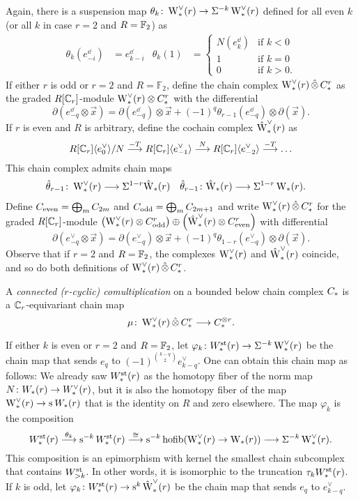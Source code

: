 Again, there is a suspension map $\theta_k\colon \rWd(r)\to \susp{-k}\rWd(r)$ defined for all even $k$ (or all $k$ in case $r=2$ and $R=\bF_2$) as
\begin{align*}
	\theta_k(e_{-i}^\dd) &= e_{k-i}^\dd 
	&
	\theta_k(1) &= \begin{cases} N(e_k^\dd) &\text{if $k<0$} \\ 1 &\text{if $k=0$} \\ 0 &\text{if $k>0$.} \end{cases}
\end{align*}
If either $r$ is odd or $r=2$ and $R=\mathbb{F}_2$, define the chain complex $\rWd(r)\hotimes \rucadenas$ as the graded $R[\Cyc_r]$-module $\rWd(r)\otimes \rucadenas$ with the differential
\[
\partial(e^\dd_{-q}\otimes \vec{x}) = \partial (e^\dd_{-q})\otimes \vec{x} + (-1)^q \theta_{r-1}(e^\dd_{-q})\otimes \partial (\vec{x}).
\]
If $r$ is even and $R$ is arbitrary, define the cochain complex $\rWhatd(r)$ as
\[
R[\Cyc_r]\langle e_{0}^\dd\rangle / N \overset{-T}{\lra} R[\Cyc_r]\langle e_{-1}^\dd\rangle \overset{N}{\lra} R[\Cyc_r]\langle e_{-2}^\dd\rangle \overset{-T}{\lra}\ldots
\]
This chain complex admits chain maps 
\begin{align*}
    \hat{\theta}_{r-1}\colon \rWd(r)&\lra \susp{1-r}\rWhat(r)
    &
    \hat{\theta}_{r-1}\colon \rWhat(r)&\lra \susp{1-r}\rW(r).
\end{align*} 
Define $\ucadenas[\mathrm{even}] = \bigoplus_{m}\ucadenas[2m]$ and $\ucadenas[\mathrm{odd}] = \bigoplus_{m}\ucadenas[2m+1]$ and write $\rWd(r)\hotimes \rucadenas$ for the graded $R[\Cyc_r]$-module $\left(\rWd(r)\otimes \rucadenas[\mathrm{odd}]\right)\oplus \left(\rWhatd(r)\otimes \rucadenas[\mathrm{even}]\right)$ with differential
\[
\partial(e^\vee_{-q}\otimes \vec{x}) = \partial (e^\vee_{-q})\otimes \vec{x} + (-1)^q \theta_{1-r}(e^\vee_{-q})\otimes \partial (\vec{x}).
\]
Observe that if $r=2$ and $R=\bF_2$, the complexes $\rWd(r)$ and $\rWhatd(r)$ coincide, and so do both definitions of $\rWd(r)\hotimes \rucadenas$.
\begin{definition}
	A \emph{connected ($r$-cyclic) comultiplication} on a \alert{bounded below} chain complex $\ucadenas$ is a $\Cyc_r$-equivariant chain map
	\[
	\mu\colon \rWd(r)\hotimes \rucadenas\lra \ucadenas^{\otimes r}.
	\]
\end{definition}

If either $k$ is even or $r=2$ and $R=\bF_2$, let $\varphi_k\colon \Wst(r)\to \susp{-k}\rWd(r)$ be the chain map that sends $e_q$ to $(-1)^{\binom{k-q}{2}}e_{k-q}^{\vee}$. One can obtain this chain map as follows: We already saw $\Wst(r)$ as the homotopy fiber of the norm map $N\colon \W(r)\to \Wd(r)$, but it is also the homotopy fiber of the map $\rWd(r)\to \sus{}\W(r)$ that is the identity on $R$ and zero elsewhere. The map $\varphi_k$ is the composition
\[
	\Wst(r)\overset{\theta_k}{\lra} \sus{-k} \Wst(r) \overset{\cong}{\lra} \sus{-k}\hofib(\rWd(r)\to \rW(r)) \lra \susp{-k}\rWd(r).
\]
This composition is an epimorphism with kernel the smallest chain subcomplex that contains $\Wst[>k]$. In other words, it is isomorphic to the truncation $\tau_k \Wst(r)$. If $k$ is odd, let $\varphi_k\colon \Wst(r)\to \sus{k}\rWhatd(r)$ be the chain map that sends $e_q$ to $e_{k-q}^{\vee}$. 

